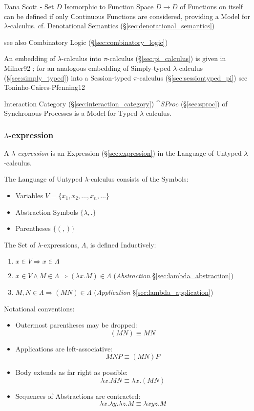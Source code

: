 Dana Scott - Set $D$ Isomorphic to Function Space $D \rightarrow D$ of
Functions on itself can be defined if only Continuous Functions are
considered, providing a Model for $\lambda$-calculus. cf. Denotational
Semantics (\S\ref{sec:denotational_semantics})

\fist see also Combinatory Logic (\S\ref{sec:combinatory_logic})

\fist An embedding of $\lambda$-calculus into $\pi$-calculus
(\S\ref{sec:pi_calculus}) is given in Milner92 \cite{milner92}; for an
analogous embedding of Simply-typed $\lambda$-calculus
(\S\ref{sec:simply_typed}) into a Session-typed $\pi$-calculus
(\S\ref{sec:sessiontyped_pi}) see Toninho-Caires-Pfenning12
\cite{caires-pfenning-toninho12}

Interaction Category (\S\ref{sec:interaction_category}) $\cat{SProc}$
(\S\ref{sec:sproc}) of Synchronous Processes is a Model for Typed
$\lambda$-calculus.



\subsubsection{$\lambda$-expression}\label{sec:lambda_expression}

A \emph{$\lambda$-expression} is an Expression
(\S\ref{sec:expression}) in the Language of Untyped
$\lambda$-calculus.

The Language of Untyped $\lambda$-calculus consists of the Symbols:
\begin{itemize}
  \item Variables $V = \{ x_1, x_2, \ldots, x_n, \ldots \}$
  \item Abstraction Symbols $\{ \lambda, . \}$
  \item Parentheses $\{ (, ) \}$
\end{itemize}

The Set of $\lambda$-expressions, $\Lambda$, is defined Inductively:
\begin{enumerate}
  \item $x \in V \Rightarrow x \in \Lambda$
  \item $x \in V \wedge M \in \Lambda \Rightarrow (\lambda x.M) \in
    \Lambda$ (\emph{Abstraction} \S\ref{sec:lambda_abstraction})
  \item $M,N \in \Lambda \Rightarrow (M N) \in \Lambda$
    (\emph{Application} \S\ref{sec:lambda_application})
\end{enumerate}
Notational conventions:
\begin{itemize}
  \item Outermost parentheses may be dropped:
    \[
      (M N) \equiv M N
    \]
  \item Applications are left-associative:
    \[
      M N P \equiv (M N) P
    \]
  \item Body extends as far right as possible:
    \[
      \lambda x.M N \equiv \lambda x.(M N)
    \]
  \item Sequences of Abstractions are contracted:
    \[
      \lambda x.\lambda y.\lambda z.M \equiv
      \lambda xyz.M
    \]
\end{itemize}

